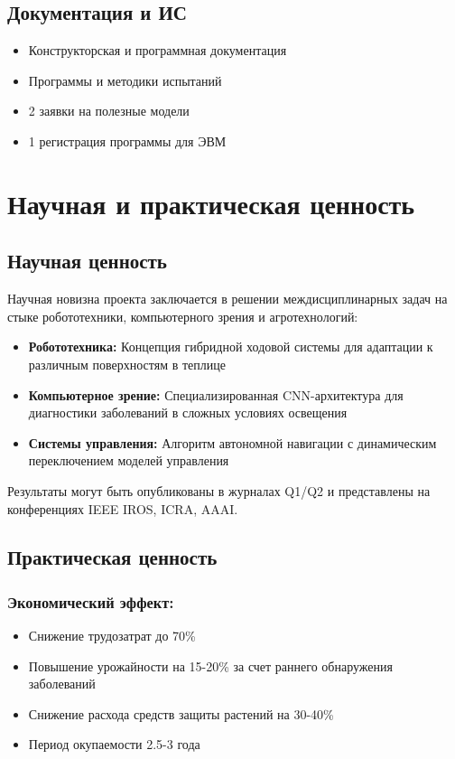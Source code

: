 \documentclass[12pt,a4paper]{article}
\begin{document}
\subsection{Документация и ИС}
\begin{itemize}
    \item Конструкторская и программная документация
    \item Программы и методики испытаний
    \item 2 заявки на полезные модели
    \item 1 регистрация программы для ЭВМ
\end{itemize}

\section{Научная и практическая ценность}

\subsection{Научная ценность}
Научная новизна проекта заключается в решении междисциплинарных задач на стыке робототехники, компьютерного зрения и агротехнологий:

\begin{itemize}
    \item \textbf{Робототехника:} Концепция гибридной ходовой системы для адаптации к различным поверхностям в теплице
    \item \textbf{Компьютерное зрение:} Специализированная CNN-архитектура для диагностики заболеваний в сложных условиях освещения
    \item \textbf{Системы управления:} Алгоритм автономной навигации с динамическим переключением моделей управления
\end{itemize}

Результаты могут быть опубликованы в журналах Q1/Q2 и представлены на конференциях IEEE IROS, ICRA, AAAI.

\subsection{Практическая ценность}
\subsubsection{Экономический эффект:}
\begin{itemize}
    \item Снижение трудозатрат до 70\%
    \item Повышение урожайности на 15-20\% за счет раннего обнаружения заболеваний
    \item Снижение расхода средств защиты растений на 30-40\%
    \item Период окупаемости 2.5-3 года
\end{itemize}
\end{document}

